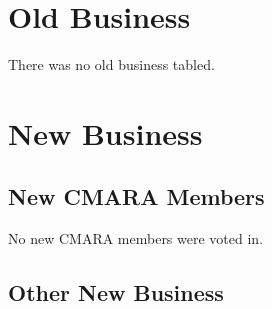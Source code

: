 \documentclass[10pt,letterpaper]{article}
\begin{document}
\section{Old Business}
There was no old business tabled.

\section{New Business}

\subsection{New CMARA Members}
No new CMARA members were voted in.

\subsection{Other New Business}
\end{document}
